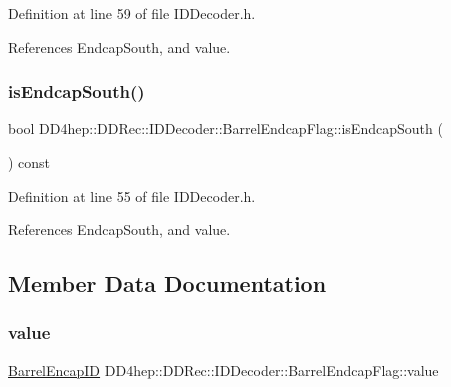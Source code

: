 Definition at line 59 of file I\+D\+Decoder.\+h.



References Endcap\+South, and value.

\hypertarget{class_d_d4hep_1_1_d_d_rec_1_1_i_d_decoder_1_1_barrel_endcap_flag_afe87905ea8427036bd87cd1a1b544fd4}{}\label{class_d_d4hep_1_1_d_d_rec_1_1_i_d_decoder_1_1_barrel_endcap_flag_afe87905ea8427036bd87cd1a1b544fd4} 
\subsubsection{\texorpdfstring{is\+Endcap\+South()}{isEndcapSouth()}}
{\footnotesize\ttfamily bool D\+D4hep\+::\+D\+D\+Rec\+::\+I\+D\+Decoder\+::\+Barrel\+Endcap\+Flag\+::is\+Endcap\+South (\begin{DoxyParamCaption}{ }\end{DoxyParamCaption}) const\hspace{0.3cm}{\ttfamily [inline]}}



Definition at line 55 of file I\+D\+Decoder.\+h.



References Endcap\+South, and value.



\subsection{Member Data Documentation}
\hypertarget{class_d_d4hep_1_1_d_d_rec_1_1_i_d_decoder_1_1_barrel_endcap_flag_a7521612ff515aea981e4136b33d7b06e}{}\label{class_d_d4hep_1_1_d_d_rec_1_1_i_d_decoder_1_1_barrel_endcap_flag_a7521612ff515aea981e4136b33d7b06e} 
\subsubsection{\texorpdfstring{value}{value}}
{\footnotesize\ttfamily \hyperlink{class_d_d4hep_1_1_d_d_rec_1_1_i_d_decoder_1_1_barrel_endcap_flag_acbdae4d36c49605ada531eddce7b60d8}{Barrel\+Encap\+ID} D\+D4hep\+::\+D\+D\+Rec\+::\+I\+D\+Decoder\+::\+Barrel\+Endcap\+Flag\+::value\hspace{0.3cm}{\ttfamily [protected]}}



